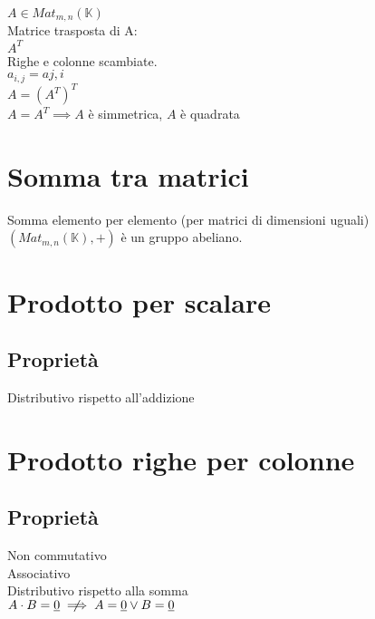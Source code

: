 \documentclass[a4paper, twoside, italian, 11pt]{book}
\newcommand{\K}{\mathbb K}
\begin{document}
$A \in Mat_{m,n}(\K)$ \\

\noindent
Matrice trasposta di A: \\
$A^T$ \\

\noindent
Righe e colonne scambiate. \\
$a_{i,j} = a{j,i}$ \\

\noindent
$A = (A^T)^T$ \\

\noindent
$A = A^T \implies A$ è simmetrica, $A$ è quadrata



\section{Somma tra matrici}

Somma elemento per elemento (per matrici di dimensioni uguali) \\

\noindent
$(Mat_{m,n}(\K), +)$ è un gruppo abeliano.



\section{Prodotto per scalare}



\subsection{Proprietà}

Distributivo rispetto all'addizione



\section{Prodotto righe per colonne}



\subsection{Proprietà}

Non commutativo \\
Associativo \\
Distributivo rispetto alla somma \\

\noindent
$A \cdot B = \underline{0} \centernot\implies A = \underline{0} \lor B = \underline{0}$ \\
\end{document}
